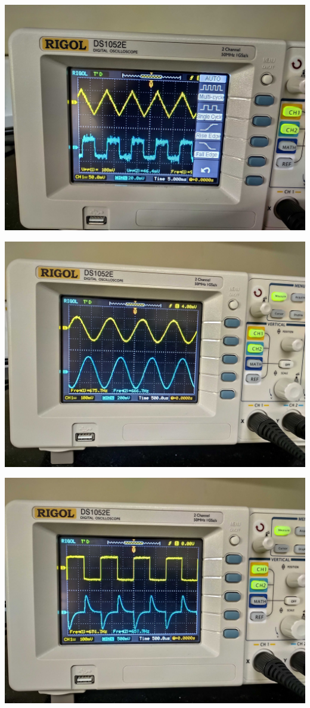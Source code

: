 \begin{center}
    \includegraphics[scale = 0.09]{Documents/Diff. Triangle.jpg}
\end{center}
\begin{center}
    \includegraphics[scale = 0.09]{Documents/Diff. Sine.jpg}
\end{center}
\bigskip
\begin{center}
    \includegraphics[scale = 0.09]{Documents/Diff. Square.jpg}
\end{center}
